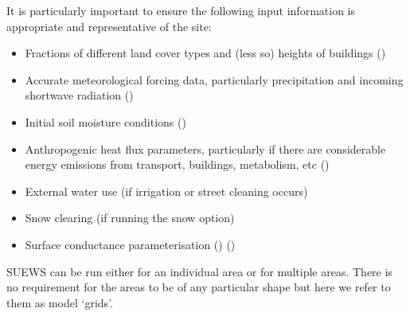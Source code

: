 \documentclass[letterpaper,10pt,english]{sphinxmanual}
\begin{document}
It is particularly important to ensure the following input information
is appropriate and representative of the site:
\begin{itemize}
\item {} 
Fractions of different land cover types and (less so) heights of
buildings \label{\detokenize{prepare-to-run-the-model:id1}}{\hyperref[\detokenize{references:w16}]{\sphinxcrossref{{[}W16{]}}}} ()

\item {} 
Accurate meteorological forcing data, particularly precipitation and
incoming shortwave radiation \label{\detokenize{prepare-to-run-the-model:id2}}{\hyperref[\detokenize{references:ko17}]{\sphinxcrossref{{[}Ko17{]}}}} ()

\item {} 
Initial soil moisture conditions \label{\detokenize{prepare-to-run-the-model:id3}}{\hyperref[\detokenize{references:best2014}]{\sphinxcrossref{{[}Best2014{]}}}} ()

\item {} 
Anthropogenic heat flux parameters, particularly if there are
considerable energy emissions from transport, buildings, metabolism,
etc \label{\detokenize{prepare-to-run-the-model:id4}}{\hyperref[\detokenize{references:w16}]{\sphinxcrossref{{[}W16{]}}}} ()

\item {} 
External water use (if irrigation or street cleaning occurs)

\item {} 
Snow clearing (if running the snow option)

\item {} 
Surface conductance parameterisation \label{\detokenize{prepare-to-run-the-model:id5}}{\hyperref[\detokenize{references:j11}]{\sphinxcrossref{{[}J11{]}}}} () \label{\detokenize{prepare-to-run-the-model:id6}}{\hyperref[\detokenize{references:w16}]{\sphinxcrossref{{[}W16{]}}}} ()

\end{itemize}

SUEWS can be run either for an individual area or for multiple areas.
There is no requirement for the areas to be of any particular shape but
here we refer to them as model ‘grids’.
\end{document}
